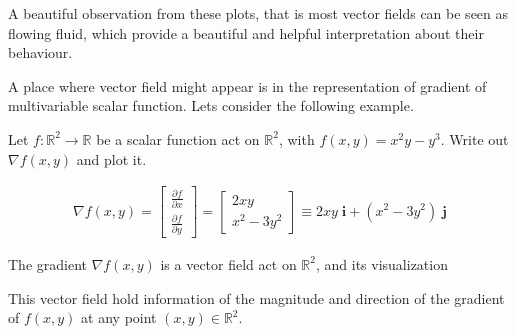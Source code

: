 \documentclass[../main.tex]{subfiles}
\begin{document}
	\par A beautiful observation from these plots, that is most vector fields can be seen as flowing fluid, which provide a beautiful and helpful interpretation about their behaviour.
	
	\par A place where vector field might appear is in the representation of gradient of multivariable scalar function. Lets consider the following example.
	\begin{example}
		Let $f: \mathbb{R}^2 \rightarrow \mathbb{R}$ be a scalar function act on $\mathbb{R}^2$, with $f(x, y) = x^2y - y^3$. Write out $\nabla f(x, y)$ and plot it.
	\end{example}
	\begin{solution}
		\begin{align*}
			\nabla f(x, y) = 
			\begin{bmatrix}
				\frac{\partial f}{\partial x} \\
				\frac{\partial f}{\partial y}
			\end{bmatrix}
			=
			\begin{bmatrix}
				2xy \\
				x^2 - 3y^2
			\end{bmatrix}
			\equiv
			2xy \;\mathbf{i} + (x^2 - 3y^2) \;\mathbf{j}
		\end{align*}
		
		The gradient $\nabla f(x, y)$ is a vector field act on $\mathbb{R}^2$, and its visualization 
		\begin{figure}[h]
			\centering
		\end{figure}
		
		This vector field hold information of the magnitude and direction of the gradient of $f(x,y)$ at any point $(x,y) \in \mathbb{R}^2$.
	\end{solution}
	
\end{document}
